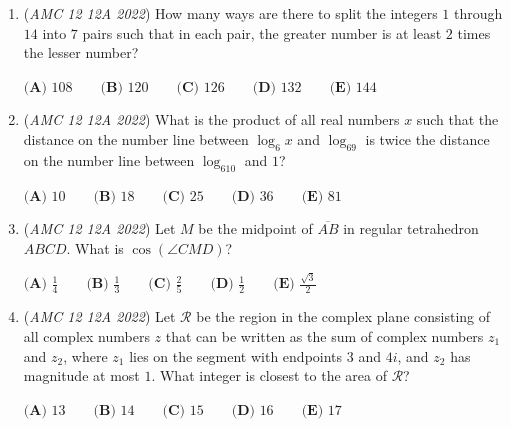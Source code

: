 \begin{enumerate}
 "Are you a truth-teller?" The principal gave a piece of candy to each of the $22$
children who answered yes.


 "Are you an alternater?" The principal gave a piece of candy to each of the $15$
children who answered yes.


 "Are you a liar?" The principal gave a piece of candy to each of the $9$ children who
answered yes.


 How many pieces of candy in all did the principal give to the children who always
tell the truth?


 $\textbf{(A) } 7 \qquad \textbf{(B) } 12 \qquad \textbf{(C) } 21 \qquad \textbf{(D) } 27 \qquad \textbf{(E) } 31$


	\item (\textit{AMC 12 12A 2022}) How many ways are there to split the integers $1$ through $14$ into $7$ pairs such that in each pair, the greater number is at least $2$ times the lesser number?


 $\textbf{(A) } 108 \qquad \textbf{(B) } 120 \qquad \textbf{(C) } 126 \qquad \textbf{(D) } 132 \qquad \textbf{(E) } 144$


	\item (\textit{AMC 12 12A 2022}) What is the product of all real numbers $x$ such that the distance on the number line between $\log_6x$ and $\log_69$ is twice the distance on the number line between $\log_610$ and $1$?


 $\textbf{(A) } 10 \qquad \textbf{(B) } 18 \qquad \textbf{(C) } 25 \qquad \textbf{(D) } 36 \qquad \textbf{(E) } 81$


	\item (\textit{AMC 12 12A 2022}) Let $M$ be the midpoint of $\overline{AB}$ in regular tetrahedron $ABCD$. What is $\cos(\angle CMD)$?


 $\textbf{(A) } \frac14 \qquad \textbf{(B) } \frac13 \qquad \textbf{(C) } \frac25 \qquad \textbf{(D) } \frac12 \qquad \textbf{(E) } \frac{\sqrt{3}}{2}$


	\item (\textit{AMC 12 12A 2022}) Let $\mathcal{R}$ be the region in the complex plane consisting of all complex numbers $z$ that can be written as the sum of complex numbers $z_1$ and $z_2$, where $z_1$ lies on the segment with endpoints $3$ and $4i$, and $z_2$ has magnitude at most $1$. What integer is closest to the area of $\mathcal{R}$?  


 $\textbf{(A) } 13 \qquad \textbf{(B) } 14 \qquad \textbf{(C) } 15 \qquad \textbf{(D) } 16 \qquad \textbf{(E) } 17$



\end{enumerate}
